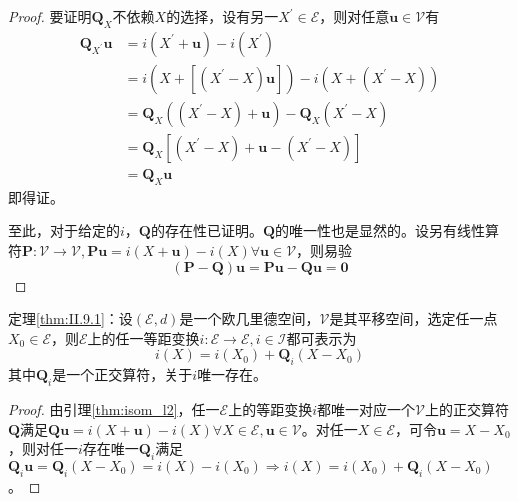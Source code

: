 \documentclass[main.tex]{subfiles}
\begin{document}
\begin{proof}
要证明$\mathbf{Q}_X$不依赖$X$的选择，设有另一$X^\prime\in\mathcal{E}$，则对任意$\mathbf{u}\in\mathcal{V}$有
\begin{align*}
\mathbf{Q}_{X^\prime}\mathbf{u}&=i\left(X^\prime+\mathbf{u}\right)-i\left(X^\prime\right)\\
&=i\left(X+\left[\left(X^\prime-X\right)\mathbf{u}\right]\right)-i\left(X+\left(X^\prime-X\right)\right)\\
&=\mathbf{Q}_X\left(\left(X^\prime-X\right)+\mathbf{u}\right)-\mathbf{Q}_X\left(X^\prime-X\right)\\
&=\mathbf{Q}_X\left[\left(X^\prime-X\right)+\mathbf{u}-\left(X^\prime-X\right)\right]\\
&=\mathbf{Q}_X\mathbf{u}
\end{align*}
即得证。

至此，对于给定的$i$，$\mathbf{Q}$的存在性已证明。$\mathbf{Q}$的唯一性也是显然的。设另有线性算符$\mathbf{P}:\mathcal{V}\rightarrow\mathcal{V},\mathbf{P}\mathbf{u}=i\left(X+\mathbf{u}\right)-i\left(X\right)\forall\mathbf{u}\in\mathcal{V}$，则易验
\[
\left(\mathbf{P}-\mathbf{Q}\right)\mathbf{u}=\mathbf{Pu}-\mathbf{Qu}=\mathbf{0}
\]
\end{proof}
\begin{theorem*}[等距变换的表示定理]
定理\ref{thm:II.9.1}：设$\left(\mathcal{E},d\right)$是一个欧几里德空间，$\mathcal{V}$是其平移空间，选定任一点$X_0\in\mathcal{E}$，则$\mathcal{E}$上的任一等距变换$i:\mathcal{E}\rightarrow\mathcal{E},i\in\mathcal{I}$都可表示为
\[
i\left(X\right)=i\left(X_0\right)+\mathbf{Q}_i\left(X-X_0\right)
\]
其中$\mathbf{Q}_i$是一个正交算符，关于$i$唯一存在。
\end{theorem*}
\begin{proof}
由引理\ref{thm:isom_l2}，任一$\mathcal{E}$上的等距变换$i$都唯一对应一个$\mathcal{V}$上的正交算符$\mathbf{Q}$满足$\mathbf{Qu}=i\left(X+\mathbf{u}\right)-i\left(X\right)\forall X\in\mathcal{E},\mathbf{u}\in\mathcal{V}$。对任一$X\in\mathcal{E}$，可令$\mathbf{u}=X-X_0$，则对任一$i$存在唯一$\mathbf{Q}_i$满足$\mathbf{Q}_i\mathbf{u}=\mathbf{Q}_i\left(X-X_0\right)=i\left(X\right)-i\left(X_0\right)\Rightarrow i\left(X\right)=i\left(X_0\right)+\mathbf{Q}_i\left(X-X_0\right)$。
\end{proof}
\end{document}
